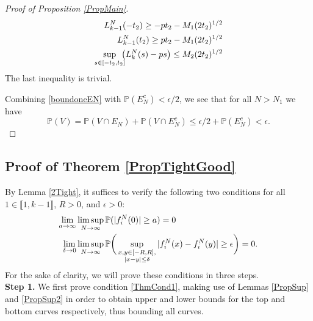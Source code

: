 \begin{proof}[Proof of Proposition \ref{PropMain}]
	\begin{equation*}
	\begin{split}
	L^N_{k-1}(-t_2) \geq  -pt_2- M_1 (2t_2)^{1/2}\\ 
	 L^N_{k-1}(t_2) \geq  p t_2- M_1(2t_2)^{1/2}\\ 
	 \sup_{s \in [ -t_2,t_2]} \hspace{-2mm}\big(L^N_k(s)  - ps \big)  \leq M_2(2t_2)^{1/2}
	\end{split}
	\end{equation*}
	The last inequality is trivial.
	
	Combining \ref{boundoneEN} with $\mathbb{P}(E_N^c) <  \epsilon/2$, we see that for all $N>N_1$ we have
	$$\mathbb{P}\left( V  \right) = \mathbb{P}(V \cap E_N) + \mathbb{P}(V \cap E_N^c) \leq \epsilon/2 + \mathbb{P}(E_N^c) < \epsilon.$$
\end{proof}


%
\subsection{Proof of Theorem \ref{PropTightGood} }\label{Section4.2}
	
		By Lemma \ref{2Tight}, it suffices to verify the following two conditions for all $1\in \llbracket 1,k-1\rrbracket$, $R>0$, and $\epsilon>0$:
	\begin{align}
	\lim_{a\to\infty} &\limsup_{N\to\infty} \mathbb{P}(|f^N_i(0)|\geq a) = 0 \label{ThmCond1}\\
	\lim_{\delta\to 0} &\limsup_{N\to\infty} \mathbb{P}\bigg(\sup_{\substack{x,y\in [-R,R], \\ |x-y|\leq\delta}} |f^N_i(x) - f^N_i(y)| \geq \epsilon\bigg)= 0. \label{ThmCond2}
	\end{align}
	For the sake of clarity, we will prove these conditions in three steps.\\
	
	\noindent\textbf{Step 1.} We first prove condition \eqref{ThmCond1}, making use of Lemmas \ref{PropSup} and \ref{PropSup2} in order to obtain upper and lower bounds for the top and bottom curves respectively, thus bounding all curves.
	
